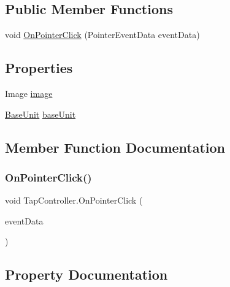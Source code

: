 \subsection*{Public Member Functions}
\begin{DoxyCompactItemize}
\item 
void \mbox{\hyperlink{class_tap_controller_ac66ecd378ed27b1ded7402b758204bec}{On\+Pointer\+Click}} (Pointer\+Event\+Data event\+Data)
\end{DoxyCompactItemize}
\subsection*{Properties}
\begin{DoxyCompactItemize}
\item 
Image \mbox{\hyperlink{class_tap_controller_a0da9433117902759e995719f5ef952aa}{image}}
\item 
\mbox{\hyperlink{class_base_unit}{Base\+Unit}} \mbox{\hyperlink{class_tap_controller_ade0ce865eb39ef6a86a8015e5bb90a55}{base\+Unit}}
\end{DoxyCompactItemize}


\subsection{Member Function Documentation}
\mbox{\label{class_tap_controller_ac66ecd378ed27b1ded7402b758204bec}} 
\subsubsection{\texorpdfstring{OnPointerClick()}{OnPointerClick()}}
{\footnotesize\ttfamily void Tap\+Controller.\+On\+Pointer\+Click (\begin{DoxyParamCaption}\item[{Pointer\+Event\+Data}]{event\+Data }\end{DoxyParamCaption})}



\subsection{Property Documentation}
\mbox{\label{class_tap_controller_ade0ce865eb39ef6a86a8015e5bb90a55}} 
